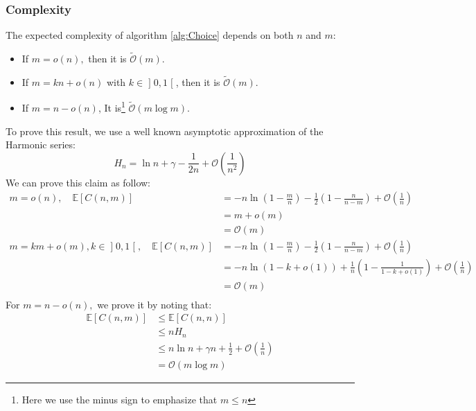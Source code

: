 \subsubsection{Complexity}
The expected complexity of algorithm \ref{alg:Choice} depends on both $n$ and $m$:
\begin{itemize}
	\item If $m=o(n),$ then it is $\tilde{\mathcal{O}}(m).$
	\item If $m=kn+o(n)$ with $k\in\mathopen]0,1\mathclose[$, then it is $\tilde{\mathcal{O}}(m).$
	\item If $m=n-o(n)$, It is\footnote{Here we use the minus sign to emphasize that $m\le n$} $\tilde{\mathcal{O}}(m\log m).$ 
\end{itemize}
To prove this result, we use a well known asymptotic approximation of the Harmonic series:
$$
H_n=\ln n+\gamma -\frac{1}{2n}+\mathcal{O}\left(\frac{1}{n^2}\right)
$$
We can prove this claim as follow:
\begin{align*}
	m=o(n),\quad \mathbb{E}[C(n,m)]&=-n\ln \left(1-\frac{m}{n}\right) -\frac{1}{2}\left(1-\frac{n}{n-m}\right)+\mathcal{O}\left(\frac{1}{n}\right) \\
	&=m+o(m)\\
	&=\mathcal{O}(m)\\
	m=km+o(m),k\in \mathopen]0,1\mathclose[,\quad \mathbb{E}[C(n,m)]&=-n\ln \left(1-\frac{m}{n}\right) -\frac{1}{2}\left(1-\frac{n}{n-m}\right)+\mathcal{O}\left(\frac{1}{n}\right) \\
&=-n\ln (1-k+o(1))+\frac{1}{n}(1-\tfrac{1}{1-k+o(1)})+\mathcal{O}(\tfrac{1}{n})\\
&=\mathcal{O}(m)\\
\end{align*}
For $m=n-o(n),$ we prove it by noting that:
\begin{align*}
\mathbb{E}[C(n,m)]&\le\mathbb{E}[C(n,n)] \\
 &\le nH_n \\
&\le n\ln n +\gamma n +\frac{1}{2}+\mathcal{O}\left(\frac{1}{n}\right) \\
&= \mathcal{O}(m\log m)
\end{align*}

